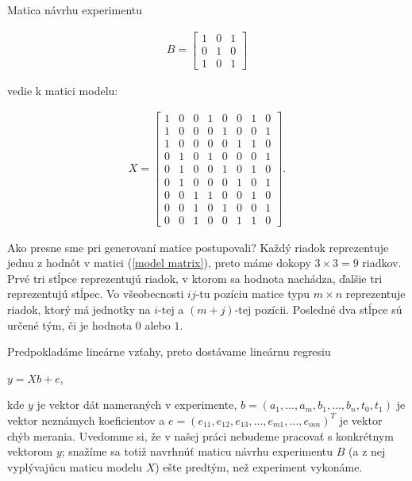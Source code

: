 Matica návrhu experimentu

\begin{align}
\label{model matrix}
B =
\begin{bmatrix}
1 & 0 & 1 \\
0 & 1 & 0 \\
1 & 0 & 1
\end{bmatrix}
\end{align}

vedie k matici modelu:

\begin{align}
\label{linear regression matrix}
X =
\begin{bmatrix}
1 & 0 & 0 & 1 & 0 & 0 & 1 & 0 \\
1 & 0 & 0 & 0 & 1 & 0 & 0 & 1 \\
1 & 0 & 0 & 0 & 0 & 1 & 1 & 0 \\
0 & 1 & 0 & 1 & 0 & 0 & 0 & 1 \\
0 & 1 & 0 & 0 & 1 & 0 & 1 & 0 \\
0 & 1 & 0 & 0 & 0 & 1 & 0 & 1 \\
0 & 0 & 1 & 1 & 0 & 0 & 1 & 0 \\
0 & 0 & 1 & 0 & 1 & 0 & 0 & 1 \\
0 & 0 & 1 & 0 & 0 & 1 & 1 & 0
\end{bmatrix}
.
\end{align}

Ako presne sme pri generovaní matice postupovali?
Každý riadok reprezentuje jednu z hodnôt v matici (\ref{model matrix}), preto máme dokopy $3 \times 3 = 9$ riadkov.
Prvé tri stĺpce reprezentujú riadok, v ktorom sa hodnota nachádza, ďalšie tri reprezentujú stĺpec.
Vo všeobecnosti $ij$-tu pozíciu matice typu $m \times n$ reprezentuje riadok,
ktorý má jednotky na $i$-tej a $(m + j)$-tej pozícii.
Posledné dva stĺpce sú určené tým, či je hodnota $0$ alebo $1$.

Predpokladáme lineárne vzťahy, preto dostávame lineárnu regresiu

\begin{center}
$
y = X b + e
$,
\end{center}

kde $y$ je vektor dát nameraných v experimente, $b = (a_1, \ldots, a_m, b_1, \ldots, b_n, t_0, t_1)$ je vektor neznámych koeficientov a 
$e = (e_{11}, e_{12}, e_{13}, \ldots, e_{m1}, \dots, e_{mn})^T$ je vektor chýb merania. 
Uvedomme si, že v našej práci nebudeme pracovať s konkrétnym vektorom $y$; 
snažíme sa totiž navrhnúť maticu návrhu experimentu $B$ (a z nej vyplývajúcu maticu modelu $X$) ešte predtým, než experiment vykonáme.

